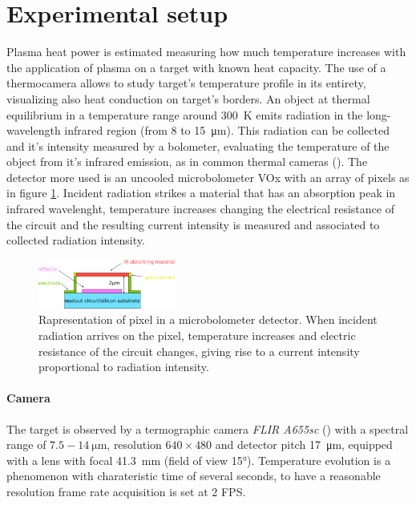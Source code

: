 \section{Experimental setup}
Plasma heat power is estimated measuring how much temperature increases with the application of plasma on a target with known heat capacity. The use of a thermocamera allows to study target's temperature profile in its entirety, visualizing also heat conduction on target's borders.
An object at thermal equilibrium in a temperature range around \SI{300}{\kelvin} emits radiation in the long-wavelength infrared region (from \num{8} to \SI{15}{\micro\meter}). This radiation can be collected and it's intensity measured by a bolometer, evaluating the temperature of the object from it's infrared emission, as in common thermal cameras (\cite{Gade2014}). The detector more used is an uncooled microbolometer VOx with an array of pixels as in figure \ref{fig:microbol}. Incident radiation strikes a material that has an absorption peak in infrared wavelenght, temperature increases changing the electrical resistance of the circuit and the resulting current intensity is measured and associated to collected radiation intensity.
\begin{figure}
 \centering
 \includegraphics[width=0.4\textwidth]{Images/Temperature/Microbolometer.png}
 \caption{Rapresentation of pixel in a microbolometer detector. When incident radiation arrives on the pixel, temperature increases and electric resistance of the circuit changes, giving rise to a current intensity proportional to radiation intensity.}
 \label{fig:microbol}
\end{figure}


\paragraph{Camera}
The target is observed by a termographic camera \emph{FLIR A655sc} (\cite{flircamera}) with a spectral range of $\num{7.5}-\SI{14}{\micro\meter}$, resolution $\num{640}\times\num{480}$ and detector pitch \SI{17}{\micro\meter}, equipped with a lens with focal \SI{41.3}{\milli\meter} (field of view \ang{15}).
Temperature evolution is a phenomenon with charateristic time of several seconds, to have a reasonable resolution frame rate acquisition is set at \num{2} FPS.

